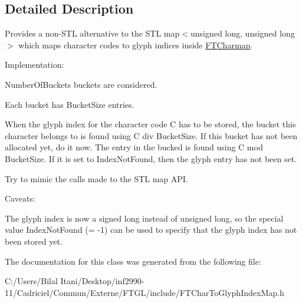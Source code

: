 \subsection{Detailed Description}
Provides a non-\/\+S\+TL alternative to the S\+TL map$<$unsigned long, unsigned long$>$ which maps character codes to glyph indices inside \hyperlink{class_f_t_charmap}{F\+T\+Charmap}.

Implementation\+:
\begin{DoxyItemize}
\item Number\+Of\+Buckets buckets are considered.
\item Each bucket has Bucket\+Size entries.
\item When the glyph index for the character code C has to be stored, the bucket this character belongs to is found using \textquotesingle{}C div Bucket\+Size\textquotesingle{}. If this bucket has not been allocated yet, do it now. The entry in the bucked is found using \textquotesingle{}C mod Bucket\+Size\textquotesingle{}. If it is set to Index\+Not\+Found, then the glyph entry has not been set.
\item Try to mimic the calls made to the S\+TL map A\+PI.
\end{DoxyItemize}

Caveats\+:
\begin{DoxyItemize}
\item The glyph index is now a signed long instead of unsigned long, so the special value Index\+Not\+Found (= -\/1) can be used to specify that the glyph index has not been stored yet. 
\end{DoxyItemize}

The documentation for this class was generated from the following file\+:\begin{DoxyCompactItemize}
\item 
C\+:/\+Users/\+Bilal Itani/\+Desktop/inf2990-\/11/\+Cadriciel/\+Commun/\+Externe/\+F\+T\+G\+L/include/F\+T\+Char\+To\+Glyph\+Index\+Map.\+h\end{DoxyCompactItemize}
